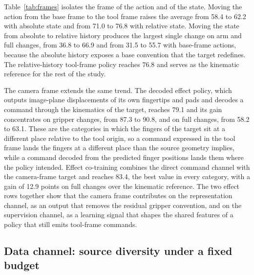 Table~\ref{tab:frames} isolates the frame of the action and of the state. Moving the action from the base frame to the tool frame raises the average from 58.4 to 62.2 with absolute state and from 71.0 to 76.8 with relative state. Moving the state from absolute to relative history produces the largest single change on arm and full changes, from 36.8 to 66.9 and from 31.5 to 55.7 with base-frame actions, because the absolute history exposes a base convention that the target redefines. The relative-history tool-frame policy reaches 76.8 and serves as the kinematic reference for the rest of the study.

The camera frame extends the same trend. The decoded effect policy, which outputs image-plane displacements of its own fingertips and pads and decodes a command through the kinematics of the target, reaches 79.1 and its gain concentrates on gripper changes, from 87.3 to 90.8, and on full changes, from 58.2 to 63.1. These are the categories in which the fingers of the target sit at a different place relative to the tool origin, so a command expressed in the tool frame lands the fingers at a different place than the source geometry implies, while a command decoded from the predicted finger positions lands them where the policy intended. Effect co-training combines the direct command channel with the camera-frame target and reaches 83.4, the best value in every category, with a gain of 12.9 points on full changes over the kinematic reference. The two effect rows together show that the camera frame contributes on the representation channel, as an output that removes the residual gripper convention, and on the supervision channel, as a learning signal that shapes the shared features of a policy that still emits tool-frame commands.

\subsection{Data channel: source diversity under a fixed budget}
\label{sec:exp-diversity}

